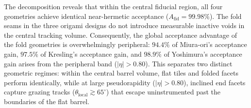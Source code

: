 \documentclass[a4paper,11pt]{article}
\begin{document}
\begin{table}[!htbp]
\centering
\caption{Fiducial ($|\eta| \le 0.80$, $\theta \in [48.39^\circ, 131.61^\circ]$) vs.\ peripheral ($|\eta| > 0.80$) acceptance decomposition, averaged across five independent runs. $A_{\text{fid}}$ and $A_{\text{periph}}$ are evaluated per run as $N_{\text{hit}} / N_{\text{gen}}$ using the actual simulated primary counts in each band; $\Delta A$ values are differences vs.\ the fine-tiled barrel. The rightmost column gives the fraction of the global acceptance gain attributable to the peripheral band ($f_{\text{periph}} \Delta A_{\text{periph}} / \Delta A_{\text{global}}$).}
\label{tab:fiducial_decomp}
\smallskip
{}
\end{table}

The decomposition reveals that within the central fiducial region, all four geometries achieve identical near-hermetic acceptance ($A_{\text{fid}} = 99.98\%$). The fold seams in the three origami designs do not introduce measurable inactive voids in the central tracking volume. Consequently, the global acceptance advantage of the fold geometries is overwhelmingly peripheral: $94.4\%$ of Miura-ori's acceptance gain, $97.5\%$ of Kresling's acceptance gain, and $98.9\%$ of Yoshimura's acceptance gain arises from the peripheral band ($|\eta| > 0.80$). This separates two distinct geometric regimes: within the central barrel volume, flat tiles and folded facets perform identically, while at large pseudorapidity ($|\eta| > 0.80$), inclined end facets capture grazing tracks ($\theta_{\text{local}} \gtrsim 65^\circ$) that escape uninstrumented past the boundaries of the flat barrel.
\end{document}
